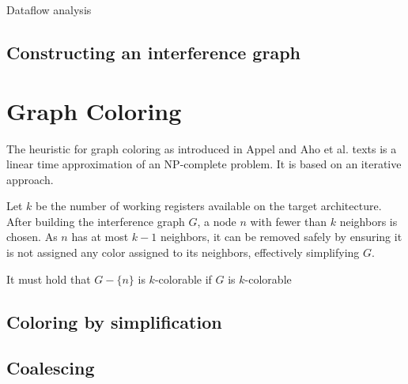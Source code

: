 \documentclass{article}
\begin{document}
Dataflow analysis 

\subsection{Constructing an interference graph}







\section{Graph Coloring}
The heuristic for graph coloring as introduced in Appel and Aho et al. texts is a linear time approximation of an NP-complete problem. It is based on an iterative approach.

Let \(k\) be the number of working registers available on the target architecture. After building the interference graph \(G\), a node \(n\) with fewer than \(k\) neighbors is chosen. As \(n\) has at most \(k-1\) neighbors, it can be removed safely by ensuring it is not assigned any color assigned to its neighbors, effectively simplifying \(G\).


It must hold that \(G-\{n\}\) is \(k\)-colorable if \(G\) is \(k\)-colorable 

\subsection{Coloring by simplification}

\subsection{Coalescing}
\end{document}
